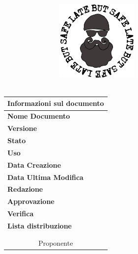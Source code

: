 %
%
%

\thispagestyle{empty}

\begin{titlepage}
	\begin{center}
		\dataUM\\	
		\vspace{2cm}
		\includegraphics[width=10cm, height=4cm]{../logo.png}\\
		\vspace{2cm}
		\Huge{\bfseries{\titoloDoc}}\\
		\vfill
	
		\begin{table}[h]
			\begin{center}
			\begin{tabular}{l  l}
				\multicolumn{2}{c}{\textbf{Informazioni sul documento}}\\
				\midrule
				\textbf{Nome Documento}	&	\titoloDoc	\\
				\textbf{Versione}	&	\versione	\\
				\textbf{Stato}	&	\emph{\stato}	\\
				\textbf{Uso}	&	\emph{\uso}	\\
				\textbf{Data Creazione}	&	\dataCreazione	\\
				\textbf{Data Ultima Modifica}	&	\dataUM	\\
				\textbf{Redazione}	&	\redaz \\
				\textbf{Approvazione}	&	\appr \\
				\textbf{Verifica}	&	\verif \\
				\textbf{Lista distribuzione}	&	\emph{\gruppo} 	\\
				\multicolumn{2}{c}{\Vardanega}	\\
				\multicolumn{2}{c}{\Cardin}	\\
				\multicolumn{2}{c}{Proponente \Zucchetti}	\\
			\end{tabular}
			\end{center}
		\end{table}
	\end{center}
\end{titlepage}